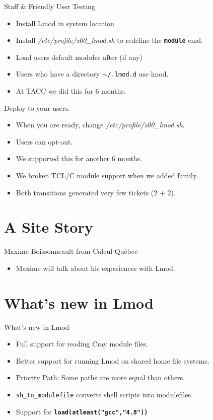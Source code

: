 \documentclass{beamer}
\begin{document}
\begin{frame}{Staff \& Friendly User Testing}
  \begin{itemize}
    \item Install Lmod in system location.
    \item Install \emph{/etc/profile/z00\_lmod.sh} to redefine the
      \texttt{\bf module} cmd.
    \item Load users default modules after (if any)
    \item Users who have a directory \texttt{$\sim$/.lmod.d} use lmod.
    \item At TACC we did this for 6 months.
  \end{itemize}
\end{frame}

\begin{frame}{Deploy to your users.}
  \begin{itemize}
    \item When you are ready, change \emph{/etc/profile/z00\_lmod.sh}.
    \item Users can opt-out.
    \item We supported this for another 6 months.
    \item We broken TCL/C module support when we added family.
    \item Both transitions generated very few tickets (2 + 2).
  \end{itemize}
\end{frame}


\section{A Site Story}

\begin{frame}{Maxime Boissonneault from Calcul Qu\'{e}bec}
  \begin{itemize}
      \item Maxime will talk about his experiences with Lmod.
  \end{itemize}
\end{frame}


\section{What's new in Lmod}

\begin{frame}{What's new in Lmod}
  \begin{itemize}
      \item Full support for reading Cray module files.
      \item Better support for running Lmod on shared home file systems.
      \item Priority Path: Some paths are more equal than others.
      \item \texttt{sh\_to\_modulefile} converts shell scripts into modulefiles.
      \item Support for \texttt{\bf load(atleast("gcc","4.8"))}
  \end{itemize}
\end{frame}
\end{document}
